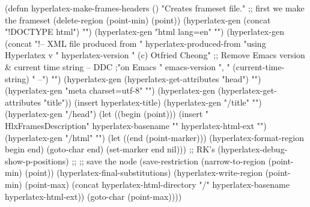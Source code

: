 \begin{ifhtml}
{(defun hyperlatex-make-frames-headers ()
  "Creates frameset file."
  ;; first we make the frameset
  (delete-region (point-min) (point))
  (hyperlatex-gen
   (concat "!DOCTYPE html")
   "\n")
  (hyperlatex-gen "html lang=en" "\n")
  (hyperlatex-gen
   (concat "!-- XML file produced from " hyperlatex-produced-from
	   "\n     using Hyperlatex v "
	   hyperlatex-version " (c) Otfried Cheong"
           ;; Remove Emacs version & current time string -- DDC
	   ;"\n     on Emacs " emacs-version ", " (current-time-string) 
           " --")
   "\n")
  (hyperlatex-gen (hyperlatex-get-attributes "head") "\n")
  (hyperlatex-gen "meta charset=utf-8" "\n")
  (hyperlatex-gen (hyperlatex-get-attributes "title"))
  (insert hyperlatex-title)
  (hyperlatex-gen "/title" "\n")
  (hyperlatex-gen "/head")
  (let ((begin (point)))
    (insert "\\HlxFramesDescription{"
	    hyperlatex-basename "}{" hyperlatex-html-ext "}")
    (hyperlatex-gen "/html" "\n")
    (let ((end (point-marker)))
      (hyperlatex-format-region begin end)
      (goto-char end)
      (set-marker end nil)))
;; RK's
  (hyperlatex-debug-show-p-positions)
;;
  ;; save the node
  (save-restriction
    (narrow-to-region (point-min) (point))
    (hyperlatex-final-substitutions)
    (hyperlatex-write-region (point-min) (point-max)
			     (concat hyperlatex-html-directory "/"
				     hyperlatex-basename hyperlatex-html-ext))
    (goto-char (point-max))))
}
\T\end{ifhtml}


\T\begin{ifhtml}
\newcommand{\hhmm}{\HlxHHMM}
\T\end{ifhtml}


